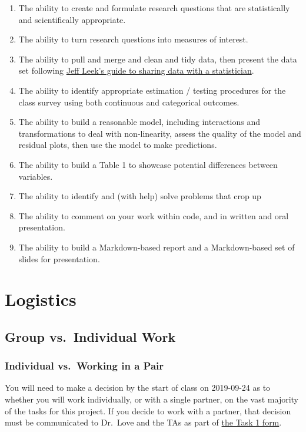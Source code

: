 \documentclass[]{book}
\providecommand{\tightlist}{%
  \setlength{\itemsep}{0pt}\setlength{\parskip}{0pt}}
\begin{document}
\begin{enumerate}
\def\labelenumi{\arabic{enumi}.}
\tightlist
\item
  The ability to create and formulate research questions that are statistically and scientifically appropriate.
\item
  The ability to turn research questions into measures of interest.
\item
  The ability to pull and merge and clean and tidy data, then present the data set following \href{https://github.com/jtleek/datasharing}{Jeff Leek's guide to sharing data with a statistician}.
\item
  The ability to identify appropriate estimation / testing procedures for the class survey using both continuous and categorical outcomes.
\item
  The ability to build a reasonable model, including interactions and transformations to deal with non-linearity, assess the quality of the model and residual plots, then use the model to make predictions.
\item
  The ability to build a Table 1 to showcase potential differences between variables.
\item
  The ability to identify and (with help) solve problems that crop up
\item
  The ability to comment on your work within code, and in written and oral presentation.
\item
  The ability to build a Markdown-based report and a Markdown-based set of slides for presentation.
\end{enumerate}

\hypertarget{logistics}{%
\chapter{Logistics}\label{logistics}}

\hypertarget{group-vs.-individual-work}{%
\section{Group vs.~Individual Work}\label{group-vs.-individual-work}}

\hypertarget{individual-vs.-working-in-a-pair}{%
\subsection{Individual vs.~Working in a Pair}\label{individual-vs.-working-in-a-pair}}

You will need to make a decision by the start of class on 2019-09-24 as to whether you will work individually, or with a single partner, on the vast majority of the tasks for this project. If you decide to work with a partner, that decision must be communicated to Dr.~Love and the TAs as part of \protect\hyperlink{task1}{the Task 1 form}.
\end{document}
